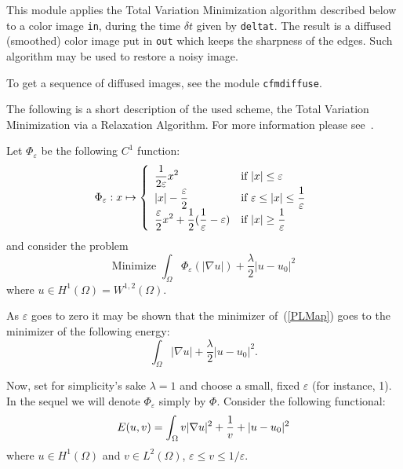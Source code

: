 \def\Om{\Omega}
\def\la{\lambda}
\def\gu{\nabla u}
\def\ve{\varepsilon}
\def\lp#1{{L}^{#1}}
\def\wlp#1#2{{W}^{#1,#2}}
\def\HunO{{H}^1(\Om)}
\def\ltwo{\lp{2}}
\def\ltwoO{\ltwo(\Om)}
\def\ds{\displaystyle}
\def\Ref#1{(\ref{#1})}

This module applies the Total Variation Minimization algorithm described
below to a color image \verb+in+, during the time $\delta t$ given by
\verb+deltat+.
The result is a diffused (smoothed) color image put in \verb+out+ which 
keeps the sharpness of the edges.
Such algorithm may be used to restore a noisy image.

To get a sequence of diffused images, see the module \verb+cfmdiffuse+.

\medskip

The following is a short description of the used scheme, the Total Variation Minimization via a Relaxation Algorithm.
For more information please see~\cite{chambolle.lions:image}.

Let $\Phi_\ve$ be the following $C^1$ function:
\begin{equation}\label{defphi}
\Phi_\ve : x \mapsto \left\{ \begin{array}{ll}
\ds{{1\over 2\ve} x^2} & \mbox{if } |x|\leq \ve \\
\ds{|x|-{\ve\over 2}}  & \mbox{if } \ve \leq |x| \leq \ds{1\over \ve} \\
\ds{{\ve\over 2} x^2 + {1\over 2}({1\over \ve}-\ve)}
& \mbox{if } |x|\geq \ds{1\over \ve}
\end{array}\right.
\end{equation}
and consider the problem
\begin{equation}\label{PLMap}
\mbox{Minimize } \int_\Om \Phi_\ve(|\gu|) + \frac{\la}{2} |u-u_0|^2
\end{equation}
where $u\in \HunO = \wlp{1}{2}(\Om)$.

As $\ve$ goes to zero it may be shown that the minimizer of~\Ref{PLMap}
goes to the minimizer of the following energy:
\begin{equation}\label{PLMap2}
\int_\Om |\gu| + \frac{\la}{2} |u-u_0|^2.
\end{equation}

Now, set for simplicity's sake
$\la = 1$ and choose a small, fixed $\ve$ (for instance, 1).
In the sequel we will denote $\Phi_\ve$ simply by $\Phi$.
Consider the following functional:
\begin{equation} \label{erelax}
E(u,v) = \int_\Om v |\gu|^2 + {1\over v} + |u-u_0|^2
\end{equation}
where $u\in \HunO$ and $v\in \ltwoO$, $\ve \leq v \leq 1/\ve$.

